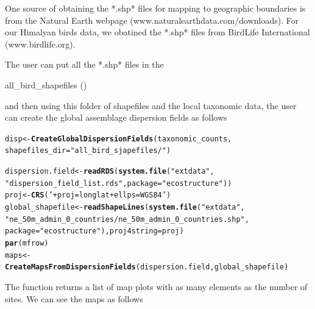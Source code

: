\documentclass[12pt]{article}\usepackage[]{graphicx}\usepackage[usenames,dvipsnames]{color}
\makeatletter
\newcommand{\hlstr}[1]{\textcolor[rgb]{0.192,0.494,0.8}{#1}}%
\newcommand{\hlstd}[1]{\textcolor[rgb]{0.345,0.345,0.345}{#1}}%
\newcommand{\hlkwb}[1]{\textcolor[rgb]{0.69,0.353,0.396}{#1}}%
\newcommand{\hlkwc}[1]{\textcolor[rgb]{0.333,0.667,0.333}{#1}}%
\newcommand{\hlkwd}[1]{\textcolor[rgb]{0.737,0.353,0.396}{\textbf{#1}}}%
\newenvironment{kframe}{%
 \def\at@end@of@kframe{}%
 \ifinner\ifhmode%
  \def\at@end@of@kframe{\end{minipage}}%
  \begin{minipage}{\columnwidth}%
 \fi\fi%
 \def\FrameCommand##1{\hskip\@totalleftmargin \hskip-\fboxsep
 \colorbox{shadecolor}{##1}\hskip-\fboxsep
     \hskip-\linewidth \hskip-\@totalleftmargin \hskip\columnwidth}%
 \MakeFramed {\advance\hsize-\width
   \@totalleftmargin\z@ \linewidth\hsize
   \@setminipage}}%
 {\par\unskip\endMakeFramed%
 \at@end@of@kframe}
\newenvironment{knitrout}{}{} %
\makeatother
\begin{document}
One source of obtaining the *.shp* files for mapping to geographic boundaries is from the Natural Earth webpage (www.naturalearthdata.com/downloads). For our Himalyan birds data, we obatined the *.shp* files from BirdLife International (www.birdlife.org).

The user can put all the *.shp* files in the \begin{verb} all_bird_shapefiles () \end{verb} and then using this folder of shapefiles and the local taxonomic data, the user can create the global assemblage dispersion fields as follows

\begin{knitrout}
\color{fgcolor}\begin{kframe}
\begin{alltt}
\hlstd{disp} \hlkwb{<-} \hlkwd{CreateGlobalDispersionFields}\hlstd{(taxonomic_counts,}
              \hlkwc{shapefiles_dir} \hlstd{=} \hlstr{"all_bird_sjapefiles/"}\hlstd{)}
\end{alltt}
\end{kframe}
\end{knitrout}


\begin{knitrout}
\color{fgcolor}\begin{kframe}
\begin{alltt}
\hlstd{dispersion.field} \hlkwb{<-} \hlkwd{readRDS}\hlstd{(}\hlkwd{system.file}\hlstd{(}\hlstr{"extdata"}\hlstd{,}
                    \hlstr{"dispersion_field_list.rds"}\hlstd{,} \hlkwc{package} \hlstd{=} \hlstr{"ecostructure"}\hlstd{))}
\hlstd{proj} \hlkwb{<-} \hlkwd{CRS}\hlstd{(}\hlstr{' +proj=longlat +ellps=WGS84'}\hlstd{)}
\hlstd{global_shapefile} \hlkwb{<-} \hlkwd{readShapeLines}\hlstd{(}\hlkwd{system.file}\hlstd{(}\hlstr{"extdata"}\hlstd{,}
         \hlstr{"ne_50m_admin_0_countries/ne_50m_admin_0_countries.shp"}\hlstd{,}
          \hlkwc{package} \hlstd{=} \hlstr{"ecostructure"}\hlstd{),} \hlkwc{proj4string}\hlstd{=proj)}
\hlkwd{par}\hlstd{(mfrow)}
\hlstd{maps} \hlkwb{<-} \hlkwd{CreateMapsFromDispersionFields}\hlstd{(dispersion.field, global_shapefile)}
\end{alltt}
\end{kframe}
\end{knitrout}

The function returns a list of map plots with as many elements as the number of sites. We can see the maps as follows
\end{document}
